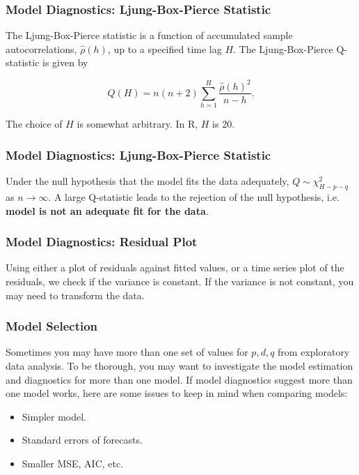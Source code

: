 \documentclass[%
xcolor=pdftex]{beamer}
\begin{document}
\begin{frame}
\frametitle{Model Diagnostics: Ljung-Box-Pierce Statistic}

The Ljung-Box-Pierce statistic is a function of accumulated sample autocorrelations, $\hat{\rho}(h)$, up to a specified time lag $H$. The Ljung-Box-Pierce Q-statistic is given by

\begin{equation} \label{eq:ljung}
Q(H) = n(n+2) \sum_{h=1}^H \frac{\hat{\rho}(h)^2}{n-h}.
\end{equation}

The choice of $H$ is somewhat arbitrary. In R, $H$ is 20.

\end{frame}

\begin{frame}
\frametitle{Model Diagnostics: Ljung-Box-Pierce Statistic}

Under the null hypothesis that the model fits the data adequately, $Q \sim \chi^2_{H-p-q}$ as $n \to \infty$. A large Q-statistic leads to the rejection of the null hypothesis, i.e. \textbf{model is not an adequate fit for the data}.


\end{frame}

\begin{frame}
\frametitle{Model Diagnostics: Residual Plot}

Using either a plot of residuals against fitted values, or a time series plot of the residuals, we check if the variance is constant. If the variance is not constant, you may need to transform the data.


\end{frame}



\begin{frame}
\frametitle{Model Selection}

Sometimes you may have more than one set of values for $p,d,q$ from exploratory data analysis. To be thorough, you may want to investigate the model estimation and diagnostics for more than one model. If model diagnostics suggest more than one model works, here are some issues to keep in mind when comparing models:

\begin{itemize}
\item Simpler model.
\item Standard errors of forecasts.
\item Smaller MSE, AIC, etc.
\end{itemize}


\end{frame}
\end{document}
